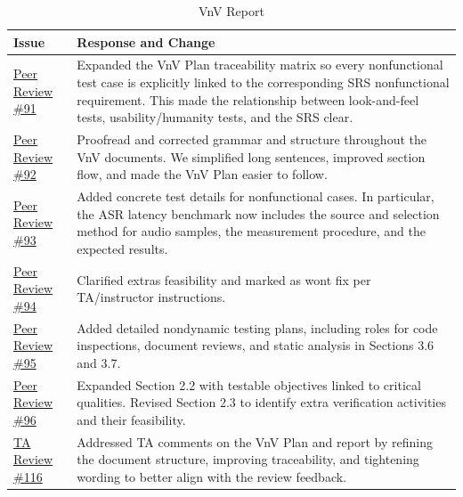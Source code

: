 \documentclass{article}
\begin{document}
\begin{table}[H]
\caption{VnV Report}
\begin{tabularx}{\textwidth}{p{4cm}X}
  \toprule
  \textbf{Issue} & \textbf{Response and Change} \\
  \midrule
  \href{https://github.com/speech-buddies/VoiceBridge/issues/91}{Peer Review \#91} & Expanded the VnV Plan traceability matrix so every nonfunctional test case is explicitly linked to the corresponding SRS nonfunctional requirement. This made the relationship between look-and-feel tests, usability/humanity tests, and the SRS clear. \\
  \midrule
  \href{https://github.com/speech-buddies/VoiceBridge/issues/92}{Peer Review \#92} & Proofread and corrected grammar and structure throughout the VnV documents. We simplified long sentences, improved section flow, and made the VnV Plan easier to follow. \\
  \midrule
  \href{https://github.com/speech-buddies/VoiceBridge/issues/93}{Peer Review \#93} & Added concrete test details for nonfunctional cases. In particular, the ASR latency benchmark now includes the source and selection method for audio samples, the measurement procedure, and the expected results. \\
  \midrule
  \href{https://github.com/speech-buddies/VoiceBridge/issues/94}{Peer Review \#94} & Clarified extras feasibility and marked as wont fix per TA/instructor instructions. \\
  \midrule
  \href{https://github.com/speech-buddies/VoiceBridge/issues/95}{Peer Review \#95} & Added detailed nondynamic testing plans, including roles for code inspections, document reviews, and static analysis in Sections 3.6 and 3.7. \\
  \midrule
  \href{https://github.com/speech-buddies/VoiceBridge/issues/96}{Peer Review \#96} & Expanded Section 2.2 with testable objectives linked to critical qualities. Revised Section 2.3 to identify extra verification activities and their feasibility. \\
  \midrule
  \href{https://github.com/speech-buddies/VoiceBridge/issues/116}{TA Review \#116} & Addressed TA comments on the VnV Plan and report by refining the document structure, improving traceability, and tightening wording to better align with the review feedback. \\
  \bottomrule
\end{tabularx}
\end{table}
\end{document}
